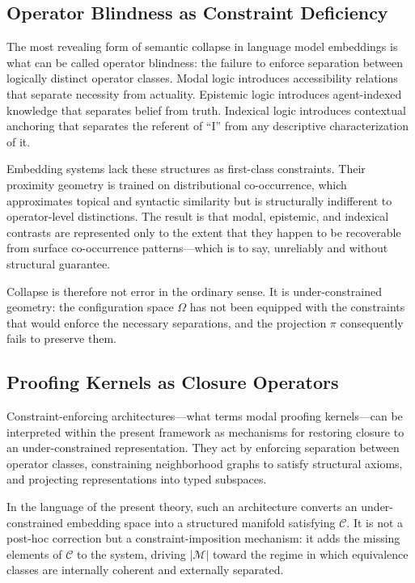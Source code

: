 \documentclass[11pt, twoside]{article}
\theoremstyle{plain}
\theoremstyle{definition}
\theoremstyle{remark}
\begin{document}
\subsection{Operator Blindness as Constraint Deficiency}

The most revealing form of semantic collapse in language model embeddings is what can be called operator blindness: the failure to enforce separation between logically distinct operator classes. Modal logic introduces accessibility relations that separate necessity from actuality. Epistemic logic introduces agent-indexed knowledge that separates belief from truth. Indexical logic introduces contextual anchoring that separates the referent of ``I'' from any descriptive characterization of it.

Embedding systems lack these structures as first-class constraints. Their proximity geometry is trained on distributional co-occurrence, which approximates topical and syntactic similarity but is structurally indifferent to operator-level distinctions. The result is that modal, epistemic, and indexical contrasts are represented only to the extent that they happen to be recoverable from surface co-occurrence patterns---which is to say, unreliably and without structural guarantee.

Collapse is therefore not error in the ordinary sense. It is under-constrained geometry: the configuration space $\Omega$ has not been equipped with the constraints that would enforce the necessary separations, and the projection $\pi$ consequently fails to preserve them.

\subsection{Proofing Kernels as Closure Operators}

Constraint-enforcing architectures---what \cite{denham2025collapse} terms modal proofing kernels---can be interpreted within the present framework as mechanisms for restoring closure to an under-constrained representation. They act by enforcing separation between operator classes, constraining neighborhood graphs to satisfy structural axioms, and projecting representations into typed subspaces.

In the language of the present theory, such an architecture converts an under-constrained embedding space into a structured manifold satisfying $\mathcal{C}$. It is not a post-hoc correction but a constraint-imposition mechanism: it adds the missing elements of $\mathcal{C}$ to the system, driving $|\mathcal{M}|$ toward the regime in which equivalence classes are internally coherent and externally separated.
\end{document}

